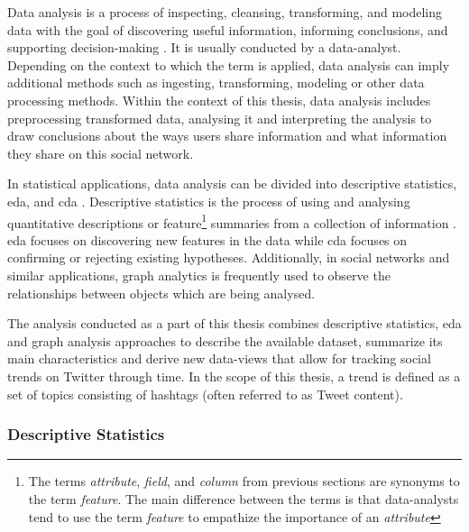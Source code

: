 Data analysis is a process of inspecting, cleansing, transforming, and modeling data with the goal of discovering useful information, informing conclusions, and supporting decision-making \cite{brown2014transforming}. It is usually conducted by a \Gls{data-analyst}. Depending on the context to which the term is applied, data analysis can imply additional methods such as ingesting, transforming, modeling or other data processing methods. Within the context of this thesis, data analysis includes preprocessing transformed data, analysing it and interpreting the analysis to draw conclusions about the ways users share information and what information they share on this social network.

In statistical applications, data analysis can be divided into descriptive statistics, \acrfull{eda}, and \acrfull{cda} \cite{leech2015spss}. Descriptive statistics is the process of using and analysing quantitative descriptions or feature\footnote{The terms \textit{attribute}, \textit{field}, and \textit{column} from previous sections are synonyms to the term \textit{feature}. The main difference between the terms is that \glspl{data-analyst} tend to use the term \textit{feature} to empathize the importance of an \textit{attribute}} summaries from a collection of information \cite{mann1995introductory}. \acrshort{eda} focuses on discovering new features in the data while \acrshort{cda} focuses on confirming or rejecting existing hypotheses. Additionally, in social networks and similar applications, graph analytics is frequently used to observe the relationships between objects which are being analysed.

The analysis conducted as a part of this thesis combines descriptive statistics, \acrshort{eda} and graph analysis approaches to describe the available dataset, summarize its main characteristics and derive new \glspl{data-view} that allow for tracking social trends on Twitter through time. In the scope of this thesis, a trend is defined as a set of topics consisting of hashtags (often referred to as Tweet content).


\subsubsection{Descriptive Statistics}
\label{subsubsec:methods-data-analysis:descriptive-statistics}

